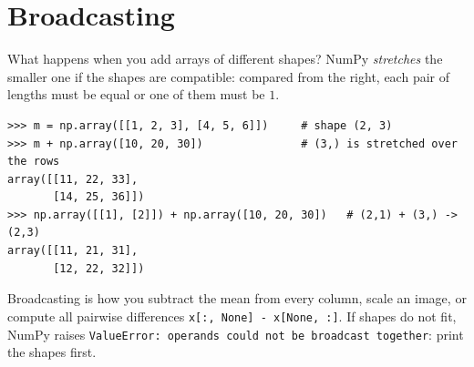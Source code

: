 \section*{Broadcasting}
What happens when you add arrays of different shapes? NumPy \emph{stretches} the smaller one if the shapes are compatible: compared from the right, each pair of lengths must be equal or one of them must be $1$.
\begin{verbatim}
>>> m = np.array([[1, 2, 3], [4, 5, 6]])     # shape (2, 3)
>>> m + np.array([10, 20, 30])               # (3,) is stretched over the rows
array([[11, 22, 33],
       [14, 25, 36]])
>>> np.array([[1], [2]]) + np.array([10, 20, 30])   # (2,1) + (3,) -> (2,3)
array([[11, 21, 31],
       [12, 22, 32]])
\end{verbatim}
\begin{center}
\label{fig:py8_bc}
\end{center}
Broadcasting is how you subtract the mean from every column, scale an image, or compute all pairwise differences \texttt{x[:, None] - x[None, :]}. If shapes do not fit, NumPy raises \texttt{ValueError: operands could not be broadcast together}: print the shapes first.

